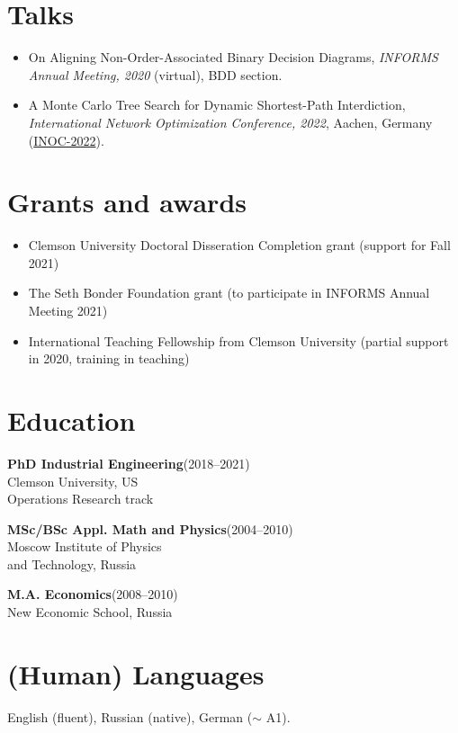 \documentclass[11pt, a4paper]{article} \usepackage{geometry} %
\newcommand{\edu}[3]{
  \textbf{#1}\hfill (#2)\\
  #3\vspace{0.7em}}
\begin{document}
 \section*{Talks}
 \begin{itemize}
   \itemsep0pt
 \item On Aligning Non-Order-Associated Binary Decision Diagrams, \textit{INFORMS Annual
   Meeting, 2020} (virtual), BDD section.
 \item A Monte Carlo Tree Search for Dynamic Shortest-Path Interdiction,
   \textit{International Network Optimization Conference, 2022}, Aachen, Germany
   (\href{https://sites.google.com/view/inoc2022/schedule}{INOC-2022}).
 \end{itemize}

 \section*{Grants and awards}
 \begin{itemize}
 \itemsep0pt 
    \item Clemson University Doctoral Disseration Completion grant (support for Fall 2021)
    \item The Seth Bonder Foundation grant (to participate in INFORMS Annual Meeting 2021)
    \item International Teaching Fellowship from Clemson University (partial
      support in 2020, training in teaching)
 \end{itemize}
 \noindent
 \begin{minipage}[t]{0.49\textwidth}
   \section*{Education} 
   \edu{PhD Industrial Engineering}{2018--2021}{
     Clemson University, US\\
     Operations Research track}

   \edu{MSc/BSc Appl. Math and Physics}{2004--2010}{
     Moscow Institute of Physics\\
     and Technology, Russia}

   \edu{M.A. Economics}{2008--2010}{
   New Economic School, Russia}

\section*{(Human) Languages}
English (fluent), Russian (native), German ($\sim$ A1).

\end{minipage}\hfill%
\end{document}
